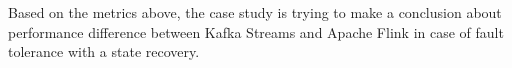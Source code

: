 Based on the metrics above, the case study is trying to make a
conclusion about performance difference between Kafka Streams and Apache Flink
in case of fault tolerance with a state recovery.

%
%
%
%
